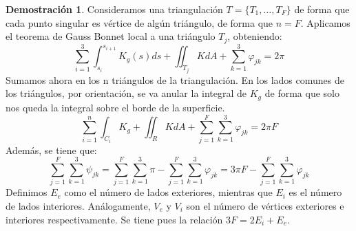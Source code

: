 \documentclass[twoside]{report}
\theoremstyle{definition}
\newtheorem*{dem}{Demostración}
\numberwithin{equation}{section}
\begin{document}
\begin{dem}
Consideramos una triangulación $T=\{T_1,\dotsc,T_F\}$ de forma que cada punto singular es vértice de algún triángulo, de forma que $n=F$. Aplicamos el teorema de Gauss Bonnet local a una triángulo $T_j$, obteniendo:
\[
\sum_{i=1}^3 \int_{s_i}^{s_{i+1}} K_g(s)ds + \iint_{T_j}KdA + \sum_{k=1}^3 \varphi_{jk} = 2\pi
\]
Sumamos ahora en los n triángulos de la triangulación. En los lados comunes de los triángulos, por orientación, se va anular la integral de $K_g$ de forma que solo nos queda la integral sobre el borde de la superficie.
\[
\sum_{i=1}^n \int_{C_i}K_g + \iint_R K dA + \sum_{j=1}^F\sum_{k=1}^3 \varphi_{jk} = 2\pi F
\]
Además, se tiene que:
\[
\sum_{j=1}^F\sum_{k=1}^3 \psi_{jk} = \sum_{j=1}^F\sum_{k=1}^3 \pi -  \sum_{j=1}^F\sum_{k=1}^3 \varphi_{jk} = 3\pi F - \sum_{j=1}^F\sum_{k=1}^3 \varphi_{jk}
\]
Definimos $E_e$ como el número de lados exteriores, mientras que $E_i$ es el número de lados interiores. Análogamente, $V_e$ y $V_i$ son el número de vértices exteriores e interiores respectivamente. Se tiene pues la relación $3F = 2E_i + E_e$.


\end{dem}
\end{document}
